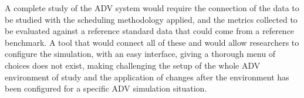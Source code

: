 A complete study of the ADV system would require the connection of the data to be studied with the scheduling methodology applied, and the metrics collected to be evaluated against a reference standard data that could come from a reference benchmark. A tool that would connect all of these and would allow researchers to configure the simulation, with an easy interface, giving a thorough menu of choices does not exist, making challenging the setup of the whole ADV environment of study and the application of changes after the environment has been configured for a specific ADV simulation situation.










